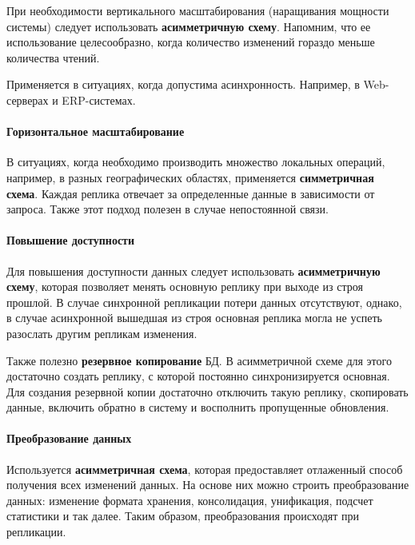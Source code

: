 При необходимости вертикального масштабирования (наращивания мощности системы) следует использовать
\textbf{асимметричную схему}. Напомним, что ее использование целесообразно, когда количество изменений
гораздо меньше количества чтений.

Применяется в ситуациях, когда допустима асинхронность. Например, в Web-серверах и ERP-системах.

\paragraph{Горизонтальное масштабирование}

В ситуациях, когда необходимо производить множество локальных операций, например, в разных
географических областях, применяется \textbf{симметричная схема}. Каждая реплика отвечает за
определенные данные в зависимости от запроса. Также этот подход полезен в случае непостоянной
связи.

\paragraph{Повышение доступности}

Для повышения доступности данных следует использовать \textbf{асимметричную схему}, которая позволяет
менять основную реплику при выходе из строя прошлой. В случае синхронной репликации потери данных
отсутствуют, однако, в случае асинхронной вышедшая из строя основная реплика могла не успеть
разослать другим репликам изменения.

Также полезно \textbf{резервное копирование} БД. В асимметричной схеме для этого достаточно создать
реплику, с которой постоянно синхронизируется основная. Для создания резервной копии достаточно
отключить такую реплику, скопировать данные, включить обратно в систему и восполнить пропущенные
обновления.

\paragraph{Преобразование данных}

Используется \textbf{асимметричная схема}, которая предоставляет отлаженный способ получения всех
изменений данных. На основе них можно строить преобразование данных: изменение формата хранения,
консолидация, унификация, подсчет статистики и так далее. Таким образом, преобразования происходят
при репликации.